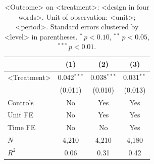 \begin{table}[t]
  \centering
  \caption{<Outcome> on <treatment>: <design in four words>. Unit of
    observation: <unit>; <period>. Standard errors clustered by <level> in
    parentheses. $^{*}$\,$p<0.10$, $^{**}$\,$p<0.05$, $^{***}$\,$p<0.01$.}
  \label{tab:main-reg}
  \begin{tabular}{lccc}
    \toprule
     & (1) & (2) & (3) \\
    \midrule
    <Treatment> & 0.042$^{***}$ & 0.038$^{***}$ & 0.031$^{**}$ \\
                & (0.011) & (0.010) & (0.013) \\
    \midrule
    Controls & No & Yes & Yes \\
    Unit FE & No & Yes & Yes \\
    Time FE & No & No & Yes \\
    \midrule
    $N$ & 4{,}210 & 4{,}210 & 4{,}180 \\
    $R^2$ & 0.06 & 0.31 & 0.42 \\
    \bottomrule
  \end{tabular}
\end{table}
